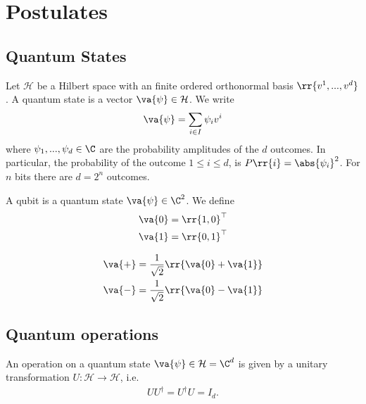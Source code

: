 \documentclass{article}
\begin{document}
\section{Postulates}
\label{sec:postulates}

\subsection{Quantum States}
\label{sec:quantum-states}

\begin{definition}
	\label{def:quantum-state}
	Let $\mathcal H$ be a Hilbert space with an finite ordered orthonormal basis
	$\rr{v^1, ..., v^d}$. A quantum state is a vector $\va{\psi}\in\mathcal H$.
	We write
	\begin{align*}
		\va{\psi} = \sum_{i\in I} \psi_i v^i
	\end{align*}
	where $\psi_1,...,\psi_d\in\C$ are the probability amplitudes of the $d$ outcomes.
	In particular, the probability of the outcome $1\leq i\leq d$, is $P \rr{ i } = \abs{ \psi_i }^2$.
	For $n$ bits there are $d=2^n$ outcomes.
\end{definition}

\begin{definition}
	\label{def:qubit}
	A qubit is a quantum state $ \va{\psi}\in\C^2$. We define
	\begin{align*}
		\va{ 0 } = \rr{ 1, 0 }^\top \\
		\va{ 1 } = \rr{ 0, 1 }^\top
	\end{align*}
\end{definition}

\begin{definition}
	\label{def:superposition}
	\begin{align*}
		\va{ + } = \frac{1}{\sqrt{2}} \rr{ \va{ 0 } + \va{ 1 } } \\
		\va{ - } = \frac{1}{\sqrt{2}} \rr{ \va{ 0 } - \va{ 1 } }
	\end{align*}
\end{definition}

\subsection{Quantum operations}
\label{sec:quantum-operations}

\begin{definition}
	\label{def:quantum-operation}
	An operation on a quantum state $ \va{ \psi } \in \mathcal H = \C^d$ is given by
	a unitary transformation $U:\mathcal H \to \mathcal H$, i.e.
	\begin{align*}
		UU^\dagger = U^\dagger U = I_d.
	\end{align*}
\end{definition}
\end{document}
